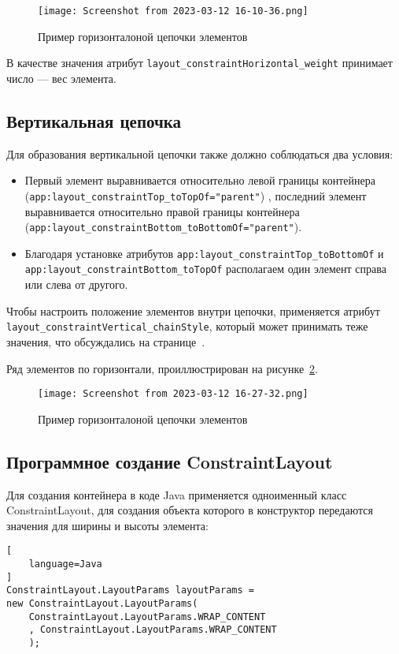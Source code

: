 \begin{figure}[h!tp]
	\centering
	\texttt{[image: Screenshot from 2023-03-12 16-10-36.png]}
	\caption{Пример горизонталоной цепочки элементов}
	\label{fig:xml:chain:horizontal:weight}
\end{figure}

В качестве значения атрибут \texttt{layout\_constraintHorizontal\_weight}
принимает число --- вес элемента.

\subsection{Вертикальная цепочка}
Для образования вертикальной цепочки также должно соблюдаться два
условия:
\begin{itemize}
	\item Первый элемент выравнивается относительно левой границы
		контейнера (\texttt{app:layout\_constraintTop\_toTopOf="parent"})
		, последний
		элемент выравнивается относительно правой границы контейнера
		(\texttt{app:layout\_constraintBottom\_toBottomOf="parent"}).
	\item Благодаря установке атрибутов
		\texttt{app:layout\_constraintTop\_toBottomOf} и
		\texttt{app:layout\_constraintBottom\_toTopOf}
		располагаем один элемент справа или слева от другого.
\end{itemize}

Чтобы настроить положение элементов внутри цепочки, применяется
атрибут \texttt{layout\_constraintVertical\_chainStyle},
который может принимать теже значения, что обсуждались
на странице~\pageref{tag:chain:style}.

Ряд элементов по горизонтали, проиллюстрирован на
рисунке~\ref{fig:xml:chain:vertical}.

\begin{figure}[h!tp]
	\centering
	\texttt{[image: Screenshot from 2023-03-12 16-27-32.png]}
	\caption{Пример горизонталоной цепочки элементов}
	\label{fig:xml:chain:vertical}
\end{figure}

\subsection{Программное создание ConstraintLayout}
Для создания контейнера в коде Java применяется одноименный класс
ConstraintLayout, для создания объекта которого в конструктор передаются
значения для ширины и высоты элемента:

\begin{lstlisting}[
	language=Java
]
ConstraintLayout.LayoutParams layoutParams = 
new ConstraintLayout.LayoutParams(
	ConstraintLayout.LayoutParams.WRAP_CONTENT
	, ConstraintLayout.LayoutParams.WRAP_CONTENT
	);
\end{lstlisting}

